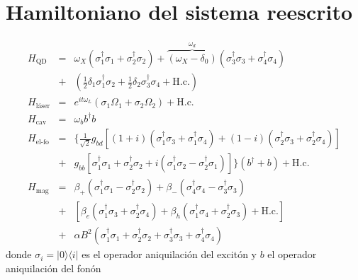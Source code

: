 \documentclass[main.tex]{subfiles}
\begin{document}
\chapter{Hamiltoniano del sistema reescrito}
\begin{eqnarray}
	H_\text{QD} &=& \omega_X (\sigma_1^{\dagger }\sigma_1 + \sigma_2^\dagger\sigma_2) + \overbrace{(\omega_X-\delta_0)}^{\omega_d} (\sigma_3^\dagger\sigma_3 + \sigma_4^\dagger\sigma_4) \nonumber\\ &+& (\tfrac{1}{2}\delta_1 \sigma_1^\dagger\sigma_2 + \tfrac{1}{2}\delta_2\sigma_3^\dagger\sigma_4 + \text{H.c.})\\
	H_\text{láser}&=& e^{i t\omega_L}(\sigma_1 \Omega_1 + \sigma_2 \Omega_2) + \text{H.c.}\\
	H_\text{cav} &=&  \omega_b b^\dagger b\\
	H_\text{el-fo} &=&  \{\tfrac{1}{\sqrt{2}} g_{bd} [(1+i) (\sigma_1^\dagger\sigma_3 + \sigma_1^\dagger\sigma_4) + (1-i) (\sigma_2^\dagger\sigma_3 + \sigma_2^\dagger\sigma_4)] \nonumber\\
	&+& g_{bb} [\sigma_1^\dagger\sigma_1 + \sigma_2^\dagger\sigma_2 + i (\sigma_1^\dagger\sigma_2 - \sigma_2^\dagger\sigma_1)]\}(b^\dagger + b)  + \text{H.c.}\\
	H_\text{mag} &=& \beta_+(\sigma_1^\dagger\sigma_1 - \sigma_2^\dagger\sigma_2) + \beta_-(\sigma_4^\dagger\sigma_4 - \sigma_3^\dagger\sigma_3) \nonumber\\
	&+& [\beta_e (\sigma_1^\dagger\sigma_3 + \sigma_2^\dagger\sigma_4) + \beta_h (\sigma _1^\dagger\sigma_4 + \sigma_2^\dagger\sigma_3) + \text{H.c.}] \nonumber\\
	&+& \alpha  B^2(\sigma_1^\dagger\sigma_1 + \sigma_2^\dagger\sigma_2 + \sigma_3^\dagger\sigma_3 + \sigma_4^\dagger\sigma_4)
\end{eqnarray}
donde $\sigma_i = |0\rangle\langle i|$ es el operador aniquilación del excitón y $b$ el operador aniquilación del fonón
\end{document}
